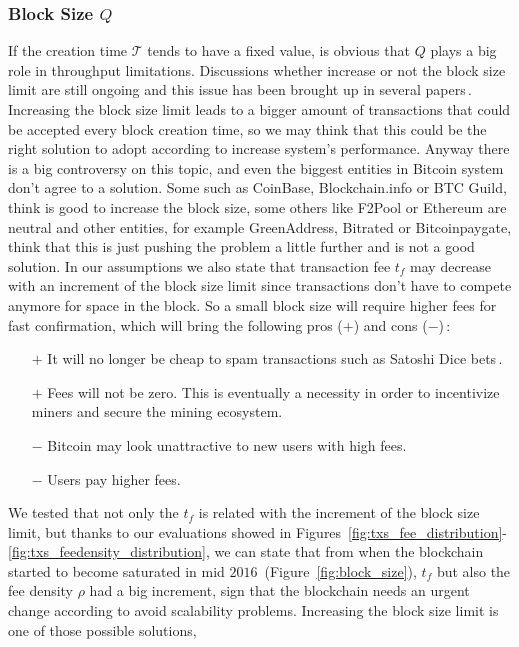 \documentclass[USenglish]{uit-thesis}
\begin{document}
\subsubsection{Block Size $Q$}
If the creation time $\mathcal{T}$ tends to have a fixed value, is obvious that
$Q$ plays a big role in throughput limitations. Discussions whether increase
or not the block size limit are still ongoing and this issue has been brought up
in several papers\,\cite{Rizun:2015:blocksizelimit, houy2014EOBTF}. Increasing
the block size limit leads to a bigger amount of transactions that could
be accepted every block creation time, so we may think that
this could be the right solution to adopt
according to increase system's performance.
Anyway there is a big controversy on this topic, and even the
biggest entities in Bitcoin system don't agree to a solution.
Some such as CoinBase, Blockchain.info or BTC Guild, think is
good to increase the block size, some others like F2Pool or Ethereum
are neutral and other entities, for example GreenAddress, Bitrated or
Bitcoinpaygate, think that this is just pushing the problem a little
further and is not a good solution.
In our assumptions we also state that transaction fee
$t_f$ may decrease with an increment of the block size
limit since transactions don't have to compete anymore for
space in the block. So a small block size will require higher
fees for fast confirmation, which will bring the
following pros ($+$) and cons ($-$)\,\cite{blocksizecontroversy}:
\begin{itemize}
	\item [$+$] It will no longer be cheap to spam transactions such as Satoshi Dice bets\,\cite{satoshidice}.
	\item [$+$] Fees will not be zero. This is eventually a necessity in order to incentivize miners and secure the mining ecosystem.
	\item [$-$] Bitcoin may look unattractive to new users with high fees.
	\item [$-$] Users pay higher fees.
\end{itemize}
We tested that not only the $t_f$ is related
with the increment of the block
size limit, but thanks to our evaluations showed in
Figures~\ref{fig:txs_fee_distribution}-\ref{fig:txs_feedensity_distribution},
we can state that from when the blockchain started
to become saturated in mid $2016$~(Figure~\ref{fig:block_size}),
$t_f$ but also the fee density $\rho$ had a big increment, sign
that the blockchain needs an urgent change according to
avoid scalability problems.
Increasing the block size limit is one of those possible solutions,
\end{document}
